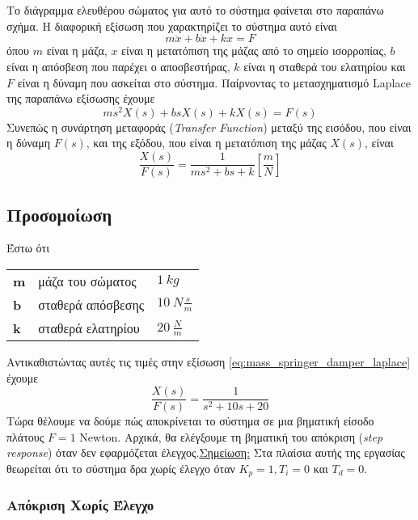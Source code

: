 Το διάγραμμα ελευθέρου σώματος για αυτό το σύστημα φαίνεται στο παραπάνω σχήμα. H διαφορική εξίσωση που χαρακτηρίζει το σύστημα αυτό είναι
\begin{equation}
m\ddot{x} + b\dot{x} + kx = F
\label{eq:mass_springer_damper_ode}
\end{equation}
όπου $m$ είναι η μάζα, $x$ είναι η μετατόπιση της μάζας από το σημείο ισορροπίας, $b$ είναι η απόσβεση που παρέχει ο αποσβεστήρας, $k$ είναι η σταθερά του ελατηρίου και $F$ είναι η δύναμη που ασκείται στο σύστημα. Παίρνοντας το μετασχηματισμό Laplace της παραπάνω εξίσωσης έχουμε
\begin{equation}
ms^2X(s) + bsX(s) + kX(s) = F(s)
\label{eq:mass_springer_damper_laplace}
\end{equation}
Συνεπώς η συνάρτηση μεταφοράς (\emph{Transfer Function}) μεταξύ της εισόδου, που είναι η δύναμη $F(s)$, και της εξόδου, που είναι η μετατόπιση της μάζας $X(s)$, είναι
\begin{equation}
\frac{X(s)}{F(s)} = \frac{1}{ms^2 + bs + k} \left[\frac{m}{N}\right]
\end{equation}

\subsection{Προσομοίωση}
\noindent
Έστω ότι 
\begin{flushleft}
\begin{tabular}{lll}
\textbf{m} & μάζα του σώματος & $1\ kg$ \\ 
\textbf{b} & σταθερά απόσβεσης & $10\ N\frac{s}{m}$ \\ 
\textbf{k} & σταθερά ελατηρίου & $20\ \frac{N}{m}$ \\ 
\end{tabular} 
\end{flushleft}
Αντικαθιστώντας αυτές τις τιμές στην εξίσωση \ref{eq:mass_springer_damper_laplace} έχουμε
\begin{equation}
\frac{X(s)}{F(s)} = \frac{1}{s^2 + 10s + 20}
\end{equation}
Τώρα θέλουμε να δούμε πώς αποκρίνεται το σύστημα σε μια βηματική είσοδο πλάτους $F=1$ Newton. Αρχικά, θα ελέγξουμε τη βηματική του απόκριση (\emph{step response}) όταν δεν εφαρμόζεται έλεγχος.\newline \underline{Σημείωση:} Στα πλαίσια αυτής της εργασίας θεωρείται ότι το σύστημα δρα χωρίς έλεγχο όταν $K_p = 1, T_i = 0$ και $T_d = 0$.

\subsubsection{Απόκριση Χωρίς Έλεγχο}

